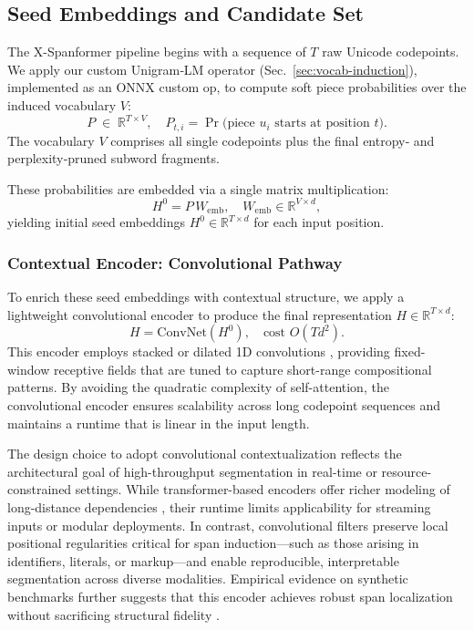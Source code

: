 \subsection{Seed Embeddings and Candidate Set}
\label{sec:seed-embeddings}

The X-Spanformer pipeline begins with a sequence of \(T\) raw Unicode codepoints. We apply our custom Unigram‐LM operator (Sec.~\ref{sec:vocab-induction}), implemented as an ONNX custom op, to compute soft piece probabilities over the induced vocabulary \(V\):
\[
P \;\in\;\mathbb{R}^{T\times V},
\quad
P_{t,i} = \Pr\bigl(\text{piece }u_i\text{ starts at position }t\bigr).
\]
The vocabulary \(V\) comprises all single codepoints plus the final entropy‐ and perplexity‐pruned subword fragments.

These probabilities are embedded via a single matrix multiplication:
\[
H^0 = P\,W_{\mathrm{emb}},
\quad
W_{\mathrm{emb}}\in\mathbb{R}^{V\times d},
\]
yielding initial seed embeddings \(H^0\in\mathbb{R}^{T\times d}\) for each input position.

\subsubsection{Contextual Encoder: Convolutional Pathway}

To enrich these seed embeddings with contextual structure, we apply a lightweight convolutional encoder to produce the final representation \(H\in\mathbb{R}^{T\times d}\):
\[
H = \mathrm{ConvNet}(H^0),\quad \text{cost }O(T d^2).
\]
This encoder employs stacked or dilated 1D convolutions \cite{tay2021charformer}, providing fixed-window receptive fields that are tuned to capture short-range compositional patterns. By avoiding the quadratic complexity of self-attention, the convolutional encoder ensures scalability across long codepoint sequences and maintains a runtime that is linear in the input length.

The design choice to adopt convolutional contextualization reflects the architectural goal of high-throughput segmentation in real-time or resource-constrained settings. While transformer-based encoders offer richer modeling of long-distance dependencies \cite{vaswani2017attention}, their runtime limits applicability for streaming inputs or modular deployments. In contrast, convolutional filters preserve local positional regularities critical for span induction—such as those arising in identifiers, literals, or markup—and enable reproducible, interpretable segmentation across diverse modalities. Empirical evidence on synthetic benchmarks further suggests that this encoder achieves robust span localization without sacrificing structural fidelity \cite{rawson2025streammix}.

